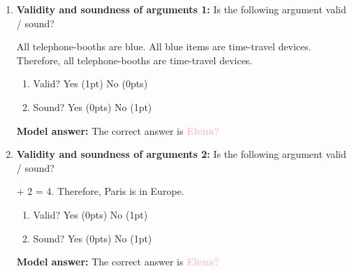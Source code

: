 \documentclass[a4,11pt]{article}
\newcommand{\jt}[1]{\textbf{\textcolor{Pink}{#1}}}
\begin{document}
\begin{enumerate}[leftmargin = 12pt]
\begin{exe}
\exi{}
\begin{xlist}
  The flying saucer came again.
 The flying saucer has come sometime in the past.
\end{xlist}
\end{exe}
   \begin{enumerate}[noitemsep]
        \item Entailment (0pts)
         \item Implicature (0pts)
           \item Presupposition (1pt)
    \end{enumerate}
    
     {\bf Model answer:} The correct answer is \jt{Elena?}
 
\item {\bf Validity and soundness of arguments 1:} Is the following argument valid / sound?
\begin{exe}
\ex
\begin{xlist}
\ex All telephone-booths are blue.
\ex All blue items are time-travel devices.
\ex Therefore, all telephone-booths are time-travel devices.
\end{xlist}
\end{exe}
 \begin{enumerate}[noitemsep]
    \item Valid? Yes (1pt) No (0pts)
    \item Sound? Yes (0pts) No (1pt)
\end{enumerate}

 {\bf Model answer:} The correct answer is \jt{Elena?}
 

\item {\bf Validity and soundness of arguments 2:} Is the following argument valid / sound?

\begin{exe}
\ex
\begin{xlist}
 + 2 = 4.
\ex Therefore, Paris is in Europe.
\end{xlist}
\end{exe}
 \begin{enumerate}[noitemsep]
    \item Valid? Yes (0pts) No (1pt)
    \item Sound? Yes (0pts) No (1pt)
\end{enumerate}

{\bf Model answer:} The correct answer is \jt{Elena?}
 


\end{enumerate}
\end{document}

